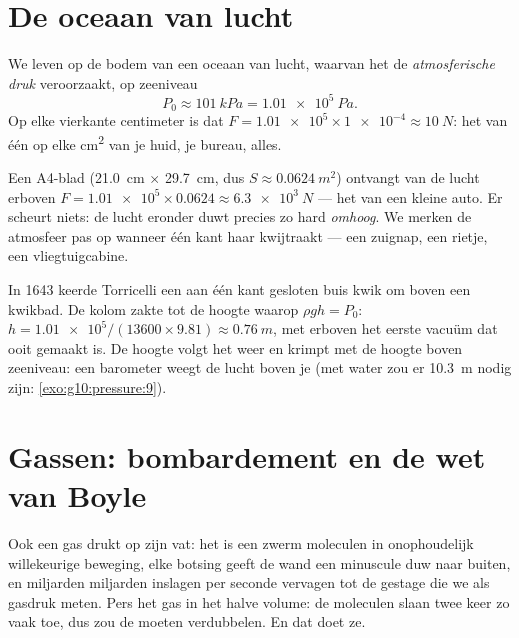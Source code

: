 \section{De oceaan van lucht}

\begin{definition}\label{def:g10:pressure:atmospheric}
We leven op de bodem van een oceaan van lucht, waarvan het  de
\emph{atmosferische druk} veroorzaakt, op
zeeniveau
\[
P_0 \approx \qty{101}{kPa} = \qty{1.01e5}{Pa}.
\]
Op elke vierkante centimeter is dat
$F = \num{1.01e5} \times \num{1e-4} \approx \qty{10}{N}$: het  van
één  op elke \unit{cm^2} van je huid, je bureau, alles.
\end{definition}

\begin{example}\label{ex:g10:pressure:sheet}
Een A4-blad (\qty{21.0}{cm} $\times$ \qty{29.7}{cm}, dus
$S \approx \qty{0.0624}{m^2}$) ontvangt van de lucht erboven
$F = \num{1.01e5} \times 0.0624 \approx \qty{6.3e3}{N}$ --- het 
van een kleine auto. Er scheurt niets: de lucht eronder duwt precies zo
hard \emph{omhoog}. We merken de atmosfeer pas op wanneer één kant haar
kwijtraakt --- een zuignap, een rietje, een vliegtuigcabine.
\end{example}

\begin{remark}\label{rem:g10:pressure:torricelli}
In 1643 keerde Torricelli een aan één kant gesloten buis kwik om boven
een kwikbad. De kolom zakte tot de hoogte waarop $\rho g h = P_0$:
$h = \num{1.01e5}/(13600 \times 9.81) \approx \qty{0.76}{m}$, met
erboven het eerste vacuüm dat ooit gemaakt is. De hoogte volgt het weer
en krimpt met de hoogte boven zeeniveau: een barometer weegt de lucht
boven je (met water zou er \qty{10.3}{m} nodig zijn:
\cref{exo:g10:pressure:9}).
\end{remark}

\section{Gassen: bombardement en de wet van Boyle}

Ook een gas drukt op zijn vat: het is een zwerm moleculen in onophoudelijk
willekeurige beweging, elke botsing geeft de wand een minuscule duw naar
buiten, en miljarden miljarden inslagen per seconde vervagen tot de
gestage  die we als gasdruk meten. Pers het gas in het halve
volume: de moleculen slaan twee keer zo vaak toe, dus zou de  moeten
verdubbelen. En dat doet ze.

